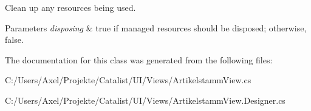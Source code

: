 Clean up any resources being used. 


\begin{DoxyParams}{Parameters}
{\em disposing} & true if managed resources should be disposed; otherwise, false.\\
\hline
\end{DoxyParams}


The documentation for this class was generated from the following files\+:\begin{DoxyCompactItemize}
\item 
C\+:/\+Users/\+Axel/\+Projekte/\+Catalist/\+U\+I/\+Views/Artikelstamm\+View.\+cs\item 
C\+:/\+Users/\+Axel/\+Projekte/\+Catalist/\+U\+I/\+Views/Artikelstamm\+View.\+Designer.\+cs\end{DoxyCompactItemize}
